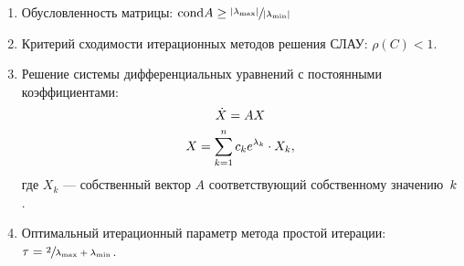 \documentclass[12pt, a4paper]{article}
\newcommand{\abs}[1]{\lvert #1 \rvert}
\begin{document}
\begin{enumerate}
	\item Обусловленность матрицы: $\text{cond} A \ge \sfrac{\abs{\lambda_{\max} }}{\abs{\lambda_{\min} }}$
	\item Критерий сходимости итерационных методов решения СЛАУ: $\rho(C) < 1$.
	\item Решение системы дифференциальных уравнений с постоянными коэффициентами:
	\begin{gather}
		\dot X = A X \notag\\
		X = \sum\limits_{k=1}^{n} c_k e^{\lambda_k} \cdot X_k, \notag
	\end{gather}
	где $X_k$ --- собственный вектор $A$ соответствующий собственному значению~$\label_{k}$.
	\item Оптимальный итерационный параметр метода простой итерации: $\tau = \sfrac{2}{\lambda_{\max} + \lambda_{\min}}$.
\end{enumerate}



	
\end{document}
